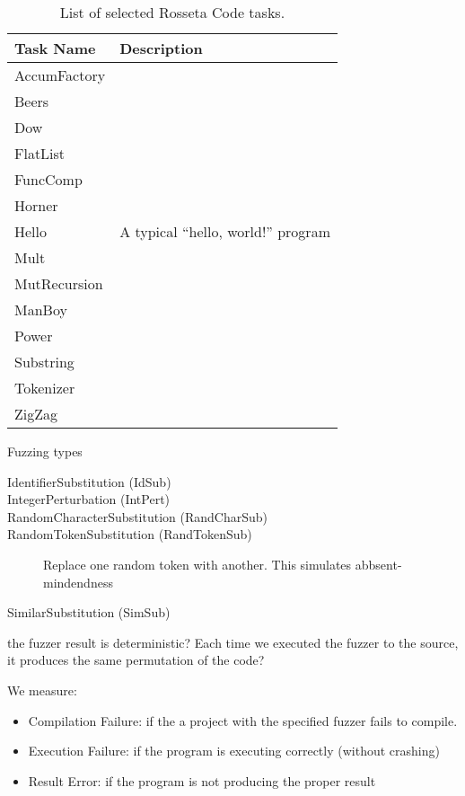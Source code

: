 \documentclass[10pt]{sigplanconf}
\begin{document}
\begin{table}
\begin{center}
\caption{List of selected Rosseta Code tasks.}
\label{tab:Tasks}
\begin{tabular}{ l p{4cm}}
 \hline
Task Name & Description\\
\hline
AccumFactory \\
Beers \\
Dow \\
FlatList \\
FuncComp \\
Horner \\
Hello & A typical ``hello, world!'' program\\
Mult \\
MutRecursion \\
ManBoy \\
Power \\
Substring \\
Tokenizer \\
ZigZag \\
\hline
\end{tabular}
\end{center}
\end{table}

Fuzzing types

\begin{description}
	\item [IdentifierSubstitution (IdSub)]
	\item [IntegerPerturbation (IntPert)]
	\item [RandomCharacterSubstitution (RandCharSub)]
	\item [RandomTokenSubstitution (RandTokenSub)] Replace one random token with another. This simulates abbsent-mindendness

	\item [SimilarSubstitution (SimSub)]
\end{description}

the fuzzer result is deterministic? Each time we executed the fuzzer to the source, it produces the same permutation of the code?

We measure:

\begin{itemize}
	\item Compilation Failure: if the a project with the specified fuzzer fails to compile.
	\item Execution Failure: if the program is executing correctly (without crashing)
	\item Result Error: if the program is not producing the proper result
\end{itemize}
\end{document}
